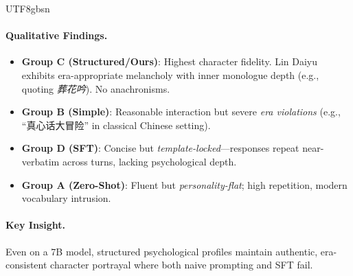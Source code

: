 \documentclass[11pt]{article}
\begin{document}
\begin{CJK*}{UTF8}{gbsn}
\paragraph{Qualitative Findings.}
\begin{itemize}
    \item \textbf{Group C (Structured/Ours)}: Highest character fidelity. Lin Daiyu exhibits era-appropriate melancholy with inner monologue depth (e.g., quoting \textit{葬花吟}). No anachronisms.
    \item \textbf{Group B (Simple)}: Reasonable interaction but severe \textit{era violations} (e.g., ``真心话大冒险'' in classical Chinese setting).
    \item \textbf{Group D (SFT)}: Concise but \textit{template-locked}---responses repeat near-verbatim across turns, lacking psychological depth.
    \item \textbf{Group A (Zero-Shot)}: Fluent but \textit{personality-flat}; high repetition, modern vocabulary intrusion.
\end{itemize}

\paragraph{Key Insight.} Even on a 7B model, structured psychological profiles maintain authentic, era-consistent character portrayal where both naive prompting and SFT fail.

\end{CJK*}
\end{document}
